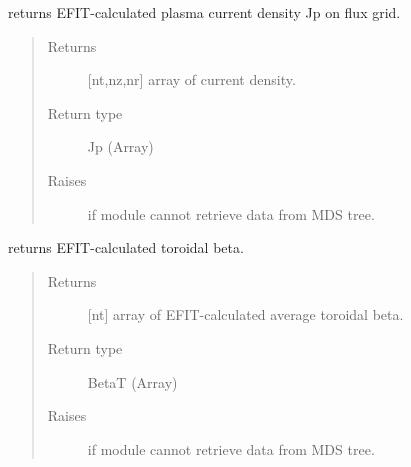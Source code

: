 \documentclass[letterpaper,10pt,english]{sphinxmanual}
\begin{document}
\begin{fulllineitems}
\begin{fulllineitems}
\end{fulllineitems}


\begin{fulllineitems}
\label{\detokenize{eqtools:eqtools.EFIT.EFITTree.getJp}}
returns EFIT-calculated plasma current density Jp on flux grid.
\begin{quote}\begin{description}
\item[{Returns}] \leavevmode
{[}nt,nz,nr{]} array of current density.

\item[{Return type}] \leavevmode
Jp (Array)

\item[{Raises}] \leavevmode
{} \textendash{} if module cannot retrieve data from MDS tree.

\end{description}\end{quote}

\end{fulllineitems}


\begin{fulllineitems}
\label{\detokenize{eqtools:eqtools.EFIT.EFITTree.getBetaT}}
returns EFIT-calculated toroidal beta.
\begin{quote}\begin{description}
\item[{Returns}] \leavevmode
{[}nt{]} array of EFIT-calculated average toroidal beta.

\item[{Return type}] \leavevmode
BetaT (Array)

\item[{Raises}] \leavevmode
{} \textendash{} if module cannot retrieve data from MDS tree.

\end{description}\end{quote}

\end{fulllineitems}


\end{fulllineitems}
\end{document}
